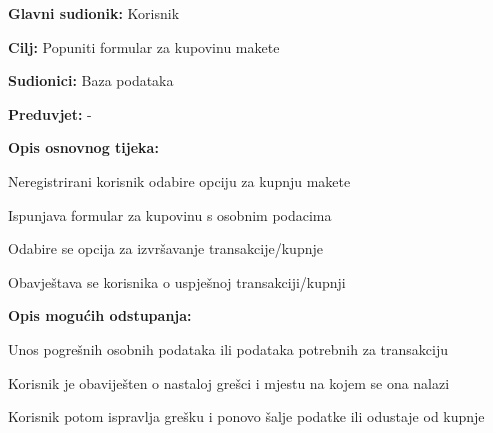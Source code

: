 					\noindent {}
				\begin{packed_item}
					
					\item \textbf{Glavni sudionik: }Korisnik
					\item  \textbf{Cilj:} Popuniti formular za kupovinu makete
					\item  \textbf{Sudionici:} Baza podataka
					\item  \textbf{Preduvjet:} -
					\item  \textbf{Opis osnovnog tijeka:}
						
					\item[] \begin{packed_enum}
							
						\item Neregistrirani korisnik odabire opciju za kupnju makete
						\item Ispunjava formular za kupovinu s osobnim podacima
						\item Odabire se opcija za izvršavanje transakcije/kupnje
						\item Obavještava se korisnika o uspješnoj transakciji/kupnji
					\end{packed_enum}
						
					\item  \textbf{Opis mogućih odstupanja:}
						
					\item[] \begin{packed_item}
							
						\item[2.a] Unos pogrešnih osobnih podataka ili podataka potrebnih za transakciju
						\item[] \begin{packed_enum}
								
							\item Korisnik je obaviješten o nastaloj grešci i mjestu na kojem se ona nalazi
							\item Korisnik potom ispravlja grešku i ponovo šalje podatke ili odustaje od kupnje
								
						\end{packed_enum}					
					\end{packed_item}
				\end{packed_item}
				
